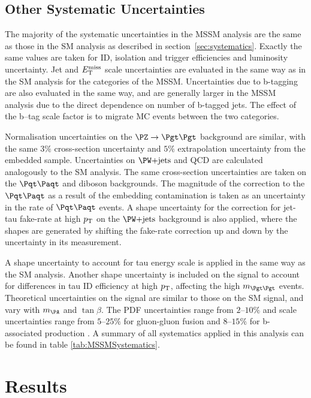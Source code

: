 \subsection{Other Systematic Uncertainties}
The majority of the systematic uncertainties in the \ac{MSSM} analysis are the
same as those in the \ac{SM} analysis as described in
section~\ref{sec:systematics}. Exactly the same values are taken for ID, isolation and
trigger efficiencies and luminosity uncertainty. Jet and $E_{\mathrm{T}}^{\text{miss}}$ scale
uncertainties are evaluated in the same way as in the \ac{SM} analysis 
for the categories of the \ac{MSSM}. 
Uncertainties due to b-tagging are also evaluated in the same way, 
and are generally larger in the \ac{MSSM} analysis due to
the direct dependence on number of b-tagged jets. The effect of the b--tag scale
factor is to migrate \ac{MC} events between the two categories.

Normalisation uncertainties on the $\ZToTauTau$ background are similar, with the
same $3\%$ cross-section uncertainty and $5\%$ extrapolation uncertainty from
the embedded sample. Uncertainties on $\WJets$ and QCD are calculated
analogously to the \ac{SM} analysis. The same cross-section uncertainties are taken on the $\ttbar$
and diboson backgrounds. The magnitude of the correction to the $\ttbar$ as a result 
of the embedding contamination is taken as an uncertainty in the rate of $\ttbar$ events. A shape 
uncertainty for the correction for jet-tau fake-rate at high $p_{\mathrm{T}}$ on the $\WJets$ background
is also applied, where the shapes are generated by shifting the fake-rate
correction up and down by the uncertainty in its measurement. 

A shape uncertainty to account for tau energy scale is applied in the same way
as the \ac{SM} analysis. Another shape uncertainty is included on the signal to account for differences in tau ID
efficiency at high $p_{\mathrm{T}}$, affecting the high $m_{\Pgt\Pgt}$ events. 
Theoretical uncertainties on the signal are similar to those on the \ac{SM} signal, and vary
with $m_{\PA}$ and $\tan\beta$. The \ac{PDF} uncertainties range from $2$--$10\%$ and scale uncertainties range from
$5$--$25\%$ for gluon-gluon fusion and $8$--$15\%$ for b-associated production
\cite{HIG-13-021}. A summary of all systematics applied in this analysis can be
found in table \ref{tab:MSSMSystematics}.



\section{Results}
\label{sec:mssmresults}

